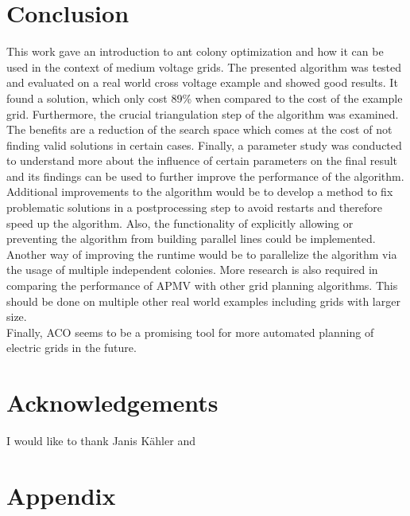 \chapter{Conclusion}\label{chap:conclusion}
This work gave an introduction to ant colony optimization and how it can be used in the context of medium voltage grids. The presented algorithm was tested and evaluated on a real world cross voltage example and showed good results. It found a solution, which only cost 89\% when compared to the cost of the example grid. Furthermore, the crucial triangulation step of the algorithm was examined. The benefits are a reduction of the search space which comes at the cost of not finding valid solutions in certain cases. Finally, a parameter study was conducted to understand more about the influence of certain parameters on the final result and its findings can be used to further improve the performance of the algorithm. \\

Additional improvements to the algorithm would be to develop a method to fix problematic solutions in a postprocessing step to avoid restarts and therefore speed up the algorithm. Also, the functionality of explicitly allowing or preventing the algorithm from building parallel lines could be implemented. Another way of improving the runtime would be to parallelize the algorithm via the usage of multiple independent colonies. More research is also required in comparing the performance of APMV with other grid planning algorithms. This should be done on multiple other real world examples including grids with larger size. \\

Finally, ACO seems to be a promising tool for more automated planning of electric grids in the future. 


\chapter*{Acknowledgements}
\thispagestyle{empty}

I would like to thank Janis Kähler and 

\clearpage



\appendix
\chapter{Appendix}


